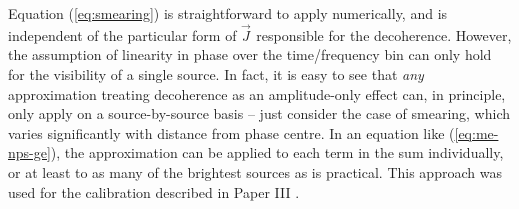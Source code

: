 \documentclass{aa}
\newcommand{\jones}[2]{\vec {#1}_{#2}}
\begin{document}
%  
%  
%  
%  
%  
%  
%  

Equation (\ref{eq:smearing}) is straightforward to apply numerically, and is independent of the particular form of $\jones{J}{}$ responsible for the decoherence. However, the assumption of linearity in phase over the time/frequency bin can only hold for the visibility of a single source. In fact, it is easy to see that {\em any} approximation treating decoherence as an amplitude-only effect can, in principle, only apply on a source-by-source basis -- just consider the case of smearing, which varies significantly with distance from phase centre. In an equation like (\ref{eq:me-nps-ge}), the approximation can be applied to each term in the sum individually, or at least to as many of the brightest sources as is practical. This approach was used for the calibration described in Paper III \citep{RRIME3}.
\end{document}
